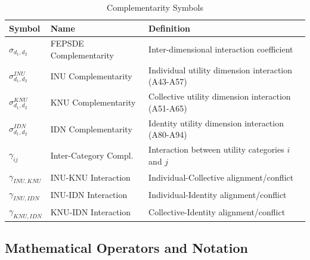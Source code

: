 \begin{longtable}{@{}lp{4cm}p{7cm}@{}}
\caption{Complementarity Symbols} \\
\toprule
\textbf{Symbol} & \textbf{Name} & \textbf{Definition} \\
\midrule
\endfirsthead
\midrule
\endhead
\bottomrule
\endlastfoot

$\sigma_{d_1,d_2}$ & FEPSDE Complementarity & Inter-dimensional interaction coefficient \\
$\sigma^{INU}_{d_1,d_2}$ & INU Complementarity & Individual utility dimension interaction (A43-A57) \\
$\sigma^{KNU}_{d_1,d_2}$ & KNU Complementarity & Collective utility dimension interaction (A51-A65) \\
$\sigma^{IDN}_{d_1,d_2}$ & IDN Complementarity & Identity utility dimension interaction (A80-A94) \\
\addlinespace
$\gamma_{ij}$ & Inter-Category Compl. & Interaction between utility categories $i$ and $j$ \\
$\gamma_{INU,KNU}$ & INU-KNU Interaction & Individual-Collective alignment/conflict \\
$\gamma_{INU,IDN}$ & INU-IDN Interaction & Individual-Identity alignment/conflict \\
$\gamma_{KNU,IDN}$ & KNU-IDN Interaction & Collective-Identity alignment/conflict \\

\end{longtable}

\subsection{Mathematical Operators and Notation}


